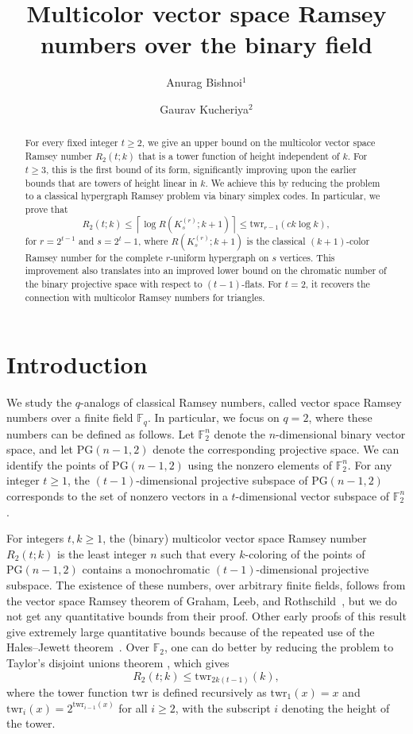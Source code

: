 \documentclass[a4paper,11pt]{amsproc}
\title{Multicolor vector space Ramsey numbers over the binary field}
\author[Bishnoi]{Anurag Bishnoi$^1$}
\author[Kucheriya]{Gaurav Kucheriya$^2$}
\theoremstyle{plain}
\theoremstyle{definition}
\begin{document}
\begin{abstract}
    For every fixed integer $t \geq 2$, we give an upper bound on the multicolor vector space Ramsey number $R_2(t; k)$ that is a tower function of height independent of $k$. 
    For $t \geq 3$, this is the first bound of its form, significantly improving upon the earlier bounds that are towers of height linear in $k$. 
    We achieve this by reducing the problem to a classical hypergraph Ramsey problem via binary simplex codes.
    In particular, we prove that 
    $$R_2(t; k) \leq \left\lceil \log R(K_s^{(r)}; k + 1) \right\rceil \leq \mathrm{twr}_{r-1}(c k\log k),$$ for $r = 2^{t - 1}$ and $s = 2^t - 1$, where $R(K_{s}^{(r)}; k + 1)$ is the classical $(k + 1)$-color Ramsey number for the complete $r$-uniform hypergraph on $s$ vertices. 
    This improvement also translates into an improved lower bound on the chromatic number of the binary projective space with respect to $(t - 1)$-flats.
    For $t = 2$, it recovers the connection with multicolor Ramsey numbers for triangles.
\end{abstract}

\maketitle

\section{Introduction}
We study the $q$-analogs of classical Ramsey numbers, called vector space Ramsey numbers over a finite field $\mathbb{F}_q$. 
In particular, we focus on $q = 2$, where these numbers can be defined as follows. 
Let $\mathbb{F}_2^n$ denote the $n$-dimensional binary vector space, and let $\mathrm{PG}(n - 1, 2)$ denote the corresponding projective space. 
We can identify the points of $\mathrm{PG}(n - 1, 2)$ using the nonzero elements of $\mathbb{F}_2^n$. 
For any integer $t \geq 1$, the $(t - 1)$-dimensional projective subspace of $\mathrm{PG}(n - 1, 2)$ corresponds to the set of nonzero vectors in a $t$-dimensional vector subspace of $\mathbb{F}_2^n$. 

For integers $t, k \geq 1$, the (binary) multicolor vector space Ramsey number $R_2(t; k)$ is the least integer $n$ such that every $k$-coloring of the points of $\mathrm{PG}(n - 1, 2)$ contains a monochromatic $(t-1)$-dimensional projective subspace. 
The existence of these numbers, over arbitrary finite fields, follows from the vector space Ramsey theorem of Graham, Leeb, and Rothschild~\cite{GrahamLeebRothschild}, but we do not get any quantitative bounds from their proof. 
Other early proofs of this result give extremely large quantitative bounds because of the repeated use of the Hales--Jewett theorem~\cite{Shelah,Spencer}.
Over $\mathbb{F}_2$, one can do better by reducing the problem to Taylor's disjoint unions theorem \cite{Taylor}, which gives 
\[R_2(t; k) \leq \mathrm{twr}_{2k(t-1)}(k),\]
where the tower function $\mathrm{twr}$ is defined recursively as $\mathrm{twr}_1(x) = x$ and $\mathrm{twr}_i(x) = 2^{\mathrm{twr}_{i-1}(x)}$ for all $i \geq 2$, with the subscript $i$ denoting the height of the tower.
\end{document}
